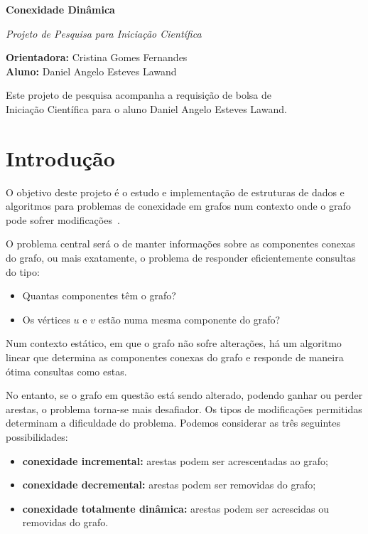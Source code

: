 \documentclass[12pt]{article}
\begin{document}
\begin{center}

  
{\Large {\bf Conexidade Dinâmica}} 

{\large {\em Projeto de Pesquisa para Iniciação Científica}

}

\vspace{0.2cm}
{\small 
{\bf Orientadora:} Cristina Gomes Fernandes \\
{\bf Aluno:} Daniel Angelo Esteves Lawand
}

\vspace{5mm} 

{\small Este projeto de pesquisa acompanha a requisição de bolsa de \\ 
  Iniciação Científica para o aluno Daniel Angelo Esteves Lawand.}

\end{center}

\section{Introdução}

O objetivo deste projeto é o estudo e implementação de estruturas de dados e algoritmos 
para problemas de conexidade em grafos num contexto onde o grafo pode sofrer 
modificações~\cite{DemetrescuFI2004}.  

O problema central será o de manter informações sobre as componentes conexas do grafo, 
ou mais exatamente, o problema de responder eficientemente consultas do tipo: 
\begin{itemize}
\item Quantas componentes têm o grafo?
\item Os vértices $u$ e $v$ estão numa mesma componente do grafo?
\end{itemize}

Num contexto estático, em que o grafo não sofre alterações, há um algoritmo linear que 
determina as componentes conexas do grafo e responde de maneira ótima consultas como estas.

No entanto, se o grafo em questão está sendo alterado, podendo ganhar ou perder arestas, 
o problema torna-se mais desafiador.  Os tipos de modificações permitidas determinam 
a dificuldade do problema.  Podemos considerar as três seguintes possibilidades: 
\begin{itemize}
\item {\bf conexidade incremental:} arestas podem ser acrescentadas ao grafo; 
\item {\bf conexidade decremental:} arestas podem ser removidas do grafo;
\item {\bf conexidade totalmente dinâmica:} arestas podem ser acrescidas ou removidas do grafo.
\end{itemize}
\end{document}
